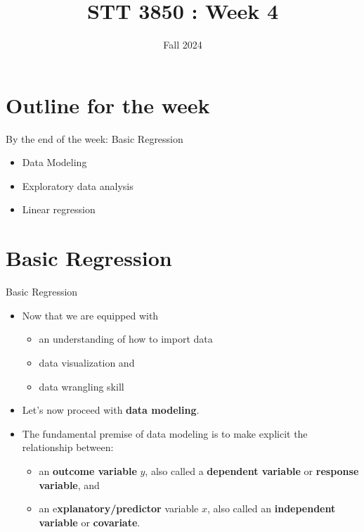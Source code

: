 \documentclass[
  ignorenonframetext,
]{beamer}
\title{STT 3850 : Week 4}
\author{Fall 2024}
\date{}
\institute{Appalachian State University}
\providecommand{\tightlist}{%
  \setlength{\itemsep}{0pt}\setlength{\parskip}{0pt}}
\begin{document}
\frame{\titlepage}

\hypertarget{outline-for-the-week}{%
\section{Outline for the week}\label{outline-for-the-week}}

\begin{frame}{By the end of the week: Basic Regression}
\protect\hypertarget{by-the-end-of-the-week-basic-regression}{}
\begin{itemize}
\tightlist
\item
  Data Modeling
\item
  Exploratory data analysis
\item
  Linear regression
\end{itemize}
\end{frame}

\hypertarget{basic-regression}{%
\section{Basic Regression}\label{basic-regression}}

\begin{frame}{Basic Regression}
\protect\hypertarget{basic-regression-1}{}
\begin{itemize}
\item
  Now that we are equipped with

  \begin{itemize}
  \tightlist
  \item
    an understanding of how to import data
  \item
    data visualization and
  \item
    data wrangling skill
  \end{itemize}
\item
  Let's now proceed with \textbf{data modeling}.
\item
  The fundamental premise of data modeling is to make explicit the
  relationship between:

  \begin{itemize}
  \tightlist
  \item
    an \textbf{outcome variable} \(y\), also called a \textbf{dependent
    variable} or \textbf{response variable}, and
  \item
    an e\textbf{xplanatory/predictor} variable \(x\), also called an
    \textbf{independent variable} or \textbf{covariate}.
  \end{itemize}
\end{itemize}
\end{frame}
\end{document}
